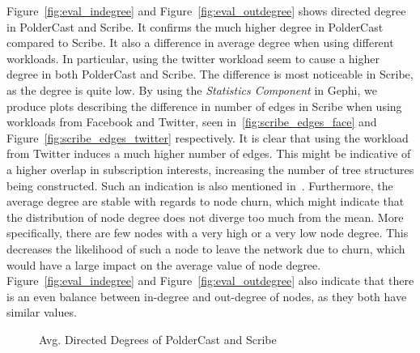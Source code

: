 Figure~\ref{fig:eval_indegree} and Figure~\ref{fig:eval_outdegree} shows
directed degree in PolderCast and Scribe. It confirms the much higher
degree in PolderCast compared to Scribe. It also a difference in average
degree when using different workloads. In particular, using the twitter
workload seem to cause a higher degree in both PolderCast and Scribe.
The difference is most noticeable in Scribe, as the degree is quite low.
By using the \emph{Statistics Component} in Gephi, we produce plots
describing the difference in number of edges in Scribe when using
workloads from Facebook and Twitter, seen in~\ref{fig:scribe_edges_face}
and Figure~\ref{fig:scribe_edges_twitter} respectively. It is clear that
using the workload from Twitter induces a much higher number of edges.
This might be indicative of a higher overlap in subscription interests,
increasing the number of tree structures being constructed. Such an
indication is also mentioned in~\cite{Setty:2012}. Furthermore, the
average degree are stable with regards to node churn, which might
indicate that the distribution of node degree does not diverge too much
from the mean. More specifically, there are few nodes with a very high
or a very low node degree. This decreases the likelihood of such a node
to leave the network due to churn, which would have a large impact on
the average value of node degree. Figure~\ref{fig:eval_indegree} and
Figure~\ref{fig:eval_outdegree} also indicate that there is an even
balance between in-degree and out-degree of nodes, as they both have
similar values.

\begin{figure}[H]
    \centering
    \caption{Avg. Directed Degrees of PolderCast and Scribe}
    \label{fig:eval_directedtdegree}
\end{figure}

